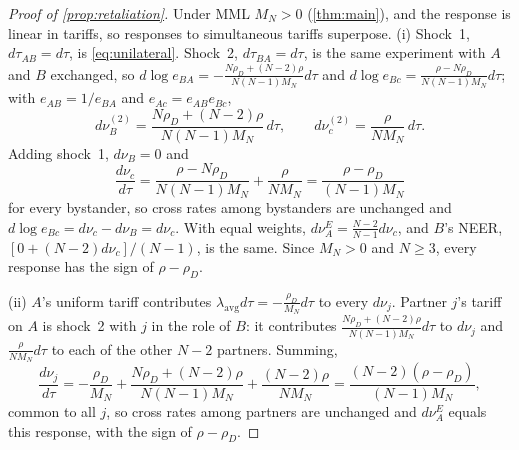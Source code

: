 \begin{proof}[Proof of \cref{prop:retaliation}]
Under MML $M_N>0$ (\cref{thm:main}), and the response is linear in tariffs, so responses to simultaneous tariffs superpose. (i) Shock~1, $d\tau_{AB}=d\tau$, is \cref{eq:unilateral}. Shock~2, $d\tau_{BA}=d\tau$, is the same experiment with $A$ and $B$ exchanged, so $d\log e_{BA}=-\frac{N\rho_D+(N-2)\rho}{N(N-1)M_N}d\tau$ and $d\log e_{Bc}=\frac{\rho-N\rho_D}{N(N-1)M_N}d\tau$; with $e_{AB}=1/e_{BA}$ and $e_{Ac}=e_{AB}e_{Bc}$,
\begin{equation*}
d\nu^{(2)}_B=\frac{N\rho_D+(N-2)\rho}{N(N-1)M_N}\,d\tau,\qquad d\nu^{(2)}_c=\frac{\rho}{NM_N}\,d\tau.
\end{equation*}
Adding shock~1, $d\nu_B=0$ and
\begin{equation*}
\frac{d\nu_c}{d\tau}=\frac{\rho-N\rho_D}{N(N-1)M_N}+\frac{\rho}{NM_N}=\frac{\rho-\rho_D}{(N-1)M_N}
\end{equation*}
for every bystander, so cross rates among bystanders are unchanged and $d\log e_{Bc}=d\nu_c-d\nu_B=d\nu_c$. With equal weights, $d\nu^E_A=\frac{N-2}{N-1}d\nu_c$, and $B$'s NEER, $[0+(N-2)d\nu_c]/(N-1)$, is the same. Since $M_N>0$ and $N\geq3$, every response has the sign of $\rho-\rho_D$.

(ii) $A$'s uniform tariff contributes $\lambda_{\mathrm{avg}}d\tau=-\frac{\rho_D}{M_N}d\tau$ to every $d\nu_j$. Partner $j$'s tariff on $A$ is shock~2 with $j$ in the role of $B$: it contributes $\frac{N\rho_D+(N-2)\rho}{N(N-1)M_N}d\tau$ to $d\nu_j$ and $\frac{\rho}{NM_N}d\tau$ to each of the other $N-2$ partners. Summing,
\begin{equation*}
\frac{d\nu_j}{d\tau}=-\frac{\rho_D}{M_N}+\frac{N\rho_D+(N-2)\rho}{N(N-1)M_N}+\frac{(N-2)\rho}{NM_N}=\frac{(N-2)(\rho-\rho_D)}{(N-1)M_N},
\end{equation*}
common to all $j$, so cross rates among partners are unchanged and $d\nu^E_A$ equals this response, with the sign of $\rho-\rho_D$.
\end{proof}

